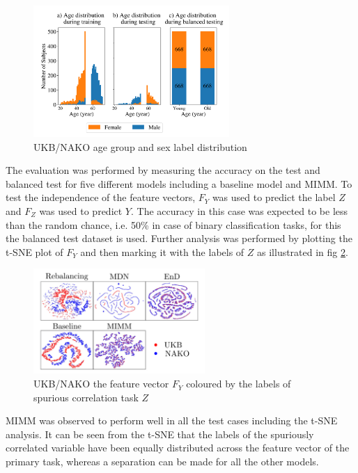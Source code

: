 \documentclass[12pt,DIV14,BCOR12mm,a4paper,footinclude=false,headinclude,parskip=half-,twoside,openright,cleardoublepage=empty,toc=index,bibliography=totoc,listof=totoc]{scrreprt}
\numberwithin{equation}{chapter}
\begin{document}
\begin{figure}[H]
    \centering
    \includegraphics[height=5cm]{thesis/figures/UKB_NAKO.png} 
    \caption{UKB/NAKO age group and sex label distribution \cite{10162210}}
    \label{fig:dataset}
\end{figure}

The evaluation was performed by measuring the accuracy on the test and  balanced test for five different models including a baseline model and MIMM. To test the independence of the feature vectors, $F_Y$ was used to predict the label $Z$ and $F_Z$ was used to predict $Y$. The accuracy in this case was expected to be less than the random chance, i.e. 50\% in case of binary classification tasks, for this the balanced test dataset is used.  Further analysis was performed by plotting the t-SNE plot of $F_Y$ and then marking it with the labels of $Z$ as illustrated in fig \ref{fig:tsne}.

\begin{figure}[H]
    \centering
    \includegraphics[height=4cm]{thesis/figures/tsne.png} 
    \caption{UKB/NAKO the feature vector $F_Y$ coloured by the labels of spurious correlation task $Z$ \cite{10162210}}
    \label{fig:tsne}
\end{figure}

MIMM was observed to perform well in all the test cases including the t-SNE analysis. It can be seen from the t-SNE that the labels of the spuriously correlated variable have been equally distributed across the feature vector of the primary task, whereas a separation can be made for all the other models.
\end{document}
